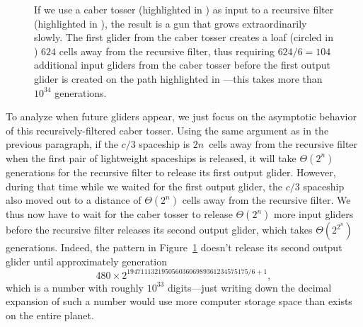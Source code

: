 \begin{figure}[!htb]
	\centering
	\caption{If we use a caber tosser (highlighted in ) as input to a recursive filter (highlighted in ), the result is a gun that grows extraordinarily slowly. The first glider from the caber tosser creates a loaf (circled in ) $624$ cells away from the recursive filter, thus requiring $624/6 = 104$ additional input gliders from the caber tosser before the first output glider is created on the path highlighted in ---this takes more than $10^{34}$ generations.}\label{fig:recursive_filter_caber}
\end{figure}

To analyze when future gliders appear, we just focus on the asymptotic behavior of this recursively-filtered caber tosser. Using the same argument as in the previous paragraph, if the $c/3$ spaceship is $2n$~cells away from the recursive filter when the first pair of lightweight spaceships is released, it will take $\Theta(2^n)$ generations for the recursive filter to release its first output glider. However, during that time while we waited for the first output glider, the $c/3$ spaceship also moved out to a distance of $\Theta(2^n)$ cells away from the recursive filter. We thus now have to wait for the caber tosser to release $\Theta(2^n)$ more input gliders before the recursive filter releases its second output glider, which takes $\Theta(2^{2^n})$ generations. Indeed, the pattern in Figure~\ref{fig:recursive_filter_caber} doesn't release its second output glider until approximately generation
\[
480 \times 2^{19471113219505603606989361234575175/6 + 1},
\]
which is a number with roughly $10^{33}$ digits---just writing down the decimal expansion of such a number would use more computer storage space than exists on the entire planet.

